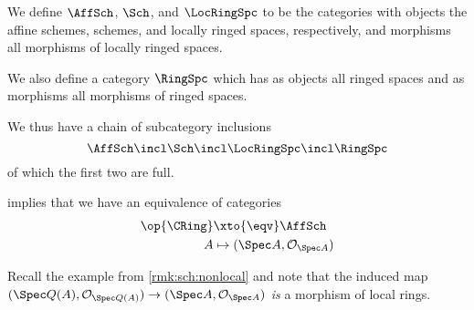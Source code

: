 \documentclass[wip, algebra]{bsteffan-lecturenotes}
\newcommand{\cO}{\mathcal{O}}
\begin{document}
\begin{definition}
	We define $\AffSch$, $\Sch$, and $\LocRingSpc$ to be the categories with objects the affine schemes, schemes, and locally ringed spaces, respectively, and morphisms all morphisms of locally ringed spaces.

	We also define a category $\RingSpc$ which has as objects all ringed spaces and as morphisms all morphisms of ringed spaces.
\end{definition}
We thus have a chain of subcategory inclusions
\begin{equation*}
	\AffSch \incl \Sch \incl \LocRingSpc \incl \RingSpc
\end{equation*}
of which the first two are full.
\begin{remark}\label{prp:sch:ringaff}
	 implies that we have an equivalence of categories 
	\begin{align*}
		\op{\CRing} &\xto{\eqv} \AffSch \\
		A &\mapsto (\Spec A, \cO_{\Spec A})
	\end{align*}
\end{remark}
\begin{remark}
	Recall the example from \cref{rmk:sch:nonlocal} and note that the induced map $(\Spec Q(A), \cO_{\Spec Q(A)}) \to (\Spec A, \cO_{\Spec A})$ \emph{is} a morphism of local rings.
\end{remark}
\end{document}
